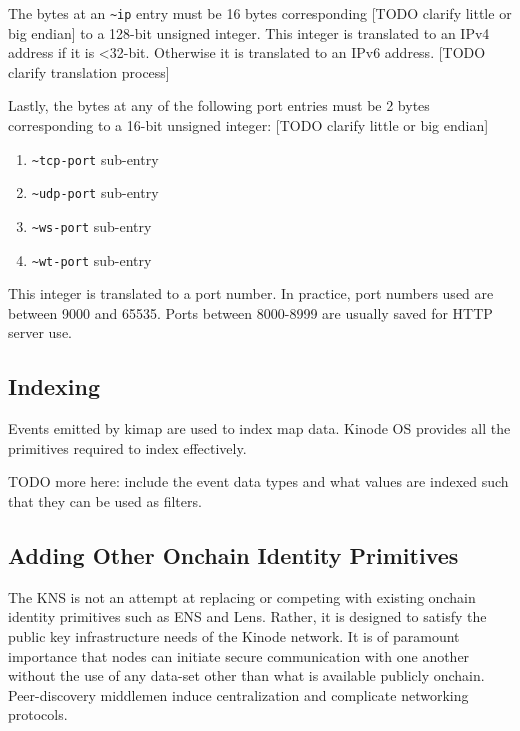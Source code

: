 \documentclass[runningheads]{llncs}
\begin{document}
The bytes at an \verb|~ip| entry must be 16 bytes corresponding [TODO clarify little or big endian] to a 128-bit unsigned integer.
This integer is translated to an IPv4 address if it is <32-bit.
Otherwise it is translated to an IPv6 address. [TODO clarify translation process]

Lastly, the bytes at any of the following port entries must be 2 bytes corresponding to a 16-bit unsigned integer: [TODO clarify little or big endian]

\begin{enumerate}
\item \verb|~tcp-port| sub-entry
\item \verb|~udp-port| sub-entry
\item \verb|~ws-port| sub-entry
\item \verb|~wt-port| sub-entry
\end{enumerate}
This integer is translated to a port number.
In practice, port numbers used are between 9000 and 65535.
Ports between 8000-8999 are usually saved for HTTP server use.

\subsection{Indexing}
\label{sec:knsindexing}

Events emitted by kimap are used to index map data.
Kinode OS provides all the primitives required to index effectively.

TODO more here: include the event data types and what values are indexed such that they can be used as filters.

\subsection{Adding Other Onchain Identity Primitives}
\label{sec:knsotherprimitives}

The KNS is not an attempt at replacing or competing with existing onchain identity primitives such as ENS and Lens.
Rather, it is designed to satisfy the public key infrastructure needs of the Kinode network.
It is of paramount importance that nodes can initiate secure communication with one another without the use of any data-set other than what is available publicly onchain.
Peer-discovery middlemen induce centralization and complicate networking protocols.
\end{document}
